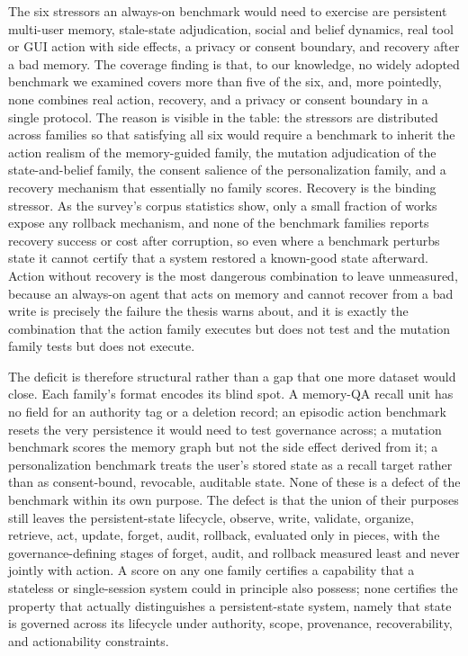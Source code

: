 The six stressors an always-on benchmark would need to exercise are persistent multi-user memory, stale-state adjudication, social and belief dynamics, real tool or GUI action with side effects, a privacy or consent boundary, and recovery after a bad memory. The coverage finding is that, to our knowledge, no widely adopted benchmark we examined covers more than five of the six, and, more pointedly, none combines real action, recovery, and a privacy or consent boundary in a single protocol. The reason is visible in the table: the stressors are distributed across families so that satisfying all six would require a benchmark to inherit the action realism of the memory-guided family, the mutation adjudication of the state-and-belief family, the consent salience of the personalization family, and a recovery mechanism that essentially no family scores. Recovery is the binding stressor. As the survey's corpus statistics show, only a small fraction of works expose any rollback mechanism, and none of the benchmark families reports recovery success or cost after corruption, so even where a benchmark perturbs state it cannot certify that a system restored a known-good state afterward. Action without recovery is the most dangerous combination to leave unmeasured, because an always-on agent that acts on memory and cannot recover from a bad write is precisely the failure the thesis warns about, and it is exactly the combination that the action family executes but does not test and the mutation family tests but does not execute.

The deficit is therefore structural rather than a gap that one more dataset would close. Each family's format encodes its blind spot. A memory-QA recall unit has no field for an authority tag or a deletion record; an episodic action benchmark resets the very persistence it would need to test governance across; a mutation benchmark scores the memory graph but not the side effect derived from it; a personalization benchmark treats the user's stored state as a recall target rather than as consent-bound, revocable, auditable state. None of these is a defect of the benchmark within its own purpose. The defect is that the union of their purposes still leaves the persistent-state lifecycle, observe, write, validate, organize, retrieve, act, update, forget, audit, rollback, evaluated only in pieces, with the governance-defining stages of forget, audit, and rollback measured least and never jointly with action. A score on any one family certifies a capability that a stateless or single-session system could in principle also possess; none certifies the property that actually distinguishes a persistent-state system, namely that state is governed across its lifecycle under authority, scope, provenance, recoverability, and actionability constraints.

